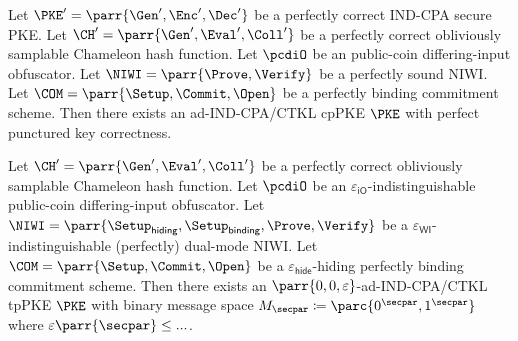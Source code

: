 \begin{theorem}[Informal]
    Let \(\PKE' = \parr{\Gen',\Enc',\Dec'}\) be a perfectly correct IND-CPA secure PKE.
    Let \(\CH' = \parr{\Gen',\Eval',\Coll'}\) be a perfectly correct obliviously samplable Chameleon hash function.
    Let \(\pcdiO\) be an public-coin differing-input obfuscator.
    Let \(\NIWI = \parr{\Prove,\Verify}\) be a perfectly sound NIWI.
    Let \(\COM = \parr{\Setup,\Commit,\Open}\) be a perfectly binding commitment scheme.
    Then there exists an ad-IND-CPA/CTKL cpPKE \(\PKE\) with perfect punctured key correctness.
\end{theorem}

\begin{theorem}\label{thm:construction-of-perfect-PK-correctness}
    Let \(\CH' = \parr{\Gen',\Eval',\Coll'}\) be a perfectly correct obliviously samplable Chameleon hash function.
    Let \(\pcdiO\) be an \(\varepsilon_{\textsf{iO}}\)-indistinguishable public-coin differing-input obfuscator.
    Let \(\NIWI = \parr{\Setup_{\textsf{hiding}},\Setup_{\textsf{binding}},\Prove,\Verify}\) be a \(\varepsilon_{\textsf{WI}}\)-indistinguishable (perfectly) dual-mode NIWI.
    Let \(\COM = \parr{\Setup,\Commit,\Open}\) be a \(\varepsilon_{\textsf{hide}}\)-hiding perfectly binding commitment scheme.
    Then there exists an \(\parr{0,0,\varepsilon}\)-ad-IND-CPA/CTKL tpPKE \(\PKE\) with binary message space \(M_\secpar \coloneq \parc{0^\secpar,1^\secpar}\) where \(\varepsilon\parr{\secpar} \leq ...\).
\end{theorem}

